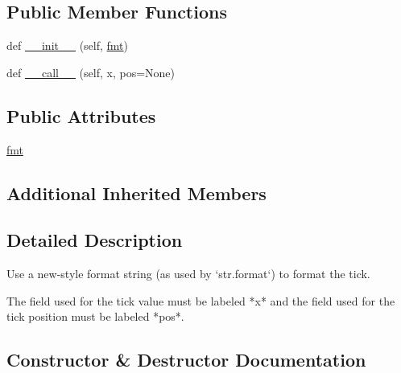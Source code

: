 \subsection*{Public Member Functions}
\begin{DoxyCompactItemize}
\item 
def \hyperlink{classmatplotlib_1_1ticker_1_1StrMethodFormatter_a422478d78e58c6805d02925c898c887f}{\+\_\+\+\_\+init\+\_\+\+\_\+} (self, \hyperlink{classmatplotlib_1_1ticker_1_1StrMethodFormatter_a241c8573d3f7c129eaff4ab29d274aa0}{fmt})
\item 
def \hyperlink{classmatplotlib_1_1ticker_1_1StrMethodFormatter_abb4c43ccf976a355e13d82e56cebd6bb}{\+\_\+\+\_\+call\+\_\+\+\_\+} (self, x, pos=None)
\end{DoxyCompactItemize}
\subsection*{Public Attributes}
\begin{DoxyCompactItemize}
\item 
\hyperlink{classmatplotlib_1_1ticker_1_1StrMethodFormatter_a241c8573d3f7c129eaff4ab29d274aa0}{fmt}
\end{DoxyCompactItemize}
\subsection*{Additional Inherited Members}


\subsection{Detailed Description}
\begin{DoxyVerb}Use a new-style format string (as used by `str.format`) to format the tick.

The field used for the tick value must be labeled *x* and the field used
for the tick position must be labeled *pos*.
\end{DoxyVerb}
 

\subsection{Constructor \& Destructor Documentation}
\mbox{\label{classmatplotlib_1_1ticker_1_1StrMethodFormatter_a422478d78e58c6805d02925c898c887f}} 
